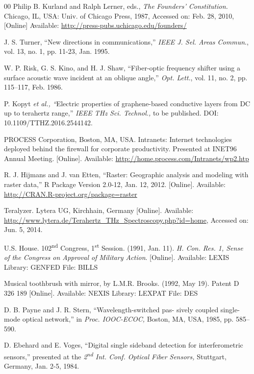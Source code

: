 \documentclass{ieeeaccess}
\begin{document}
\begin{thebibliography}{00}
 Philip B. Kurland and Ralph Lerner, eds., \emph{The
Founders' Constitution.} Chicago, IL, USA: Univ. of Chicago Press,
1987, Accessed on: Feb. 28, 2010, [Online] Available:
\underline{http://press-pubs.uchicago.edu/founders/}

 J. S. Turner, ``New directions in communications,'' \emph{IEEE J. Sel. Areas Commun}., vol. 13, no. 1, pp. 11-23, Jan. 1995.

 W. P. Risk, G. S. Kino, and H. J. Shaw, ``Fiber-optic frequency shifter using a surface acoustic wave incident at an oblique angle,'' \emph{Opt. Lett.}, vol. 11, no. 2, pp. 115--117, Feb. 1986.

 P. Kopyt \emph{et al., ``}Electric properties of graphene-based conductive layers from DC up to terahertz range,'' \emph{IEEE THz Sci. Technol.,} to be published. DOI: 10.1109/TTHZ.2016.2544142.

 PROCESS Corporation, Boston, MA, USA. Intranets:
Internet technologies deployed behind the firewall for corporate
productivity. Presented at INET96 Annual Meeting. [Online].
Available: \underline{http://home.process.com/Intranets/wp2.htp}

 R. J. Hijmans and J. van Etten, ``Raster: Geographic analysis and modeling with raster data,'' R Package Version 2.0-12, Jan. 12, 2012. [Online]. Available: \underline {http://CRAN.R-project.org/package=raster}

 Teralyzer. Lytera UG, Kirchhain, Germany [Online].
Available:
\underline{http://www.lytera.de/Terahertz\_THz\_Spectroscopy.}\break\underline{php?id=home}, Accessed on: Jun. 5, 2014.

 U.S. House. 102\textsuperscript{nd} Congress, 1\textsuperscript{st} Session. (1991, Jan. 11). \emph{H. Con. Res. 1, Sense of the Congress on Approval of}  \emph{Military Action}. [Online]. Available: LEXIS Library: GENFED File: BILLS

 Musical toothbrush with mirror, by L.M.R. Brooks. (1992, May 19). Patent D 326 189 [Online]. Available: NEXIS Library: LEXPAT File: DES

 D. B. Payne and J. R. Stern, ``Wavelength-switched pas- sively coupled single-mode optical network,'' in \emph{Proc. IOOC-ECOC,} Boston, MA, USA, 1985, pp. 585--590.

 D. Ebehard and E. Voges, ``Digital single sideband detection for interferometric sensors,'' presented at the \emph{2\textsuperscript{nd} Int. Conf. Optical Fiber Sensors,} Stuttgart, Germany, Jan. 2-5, 1984.


\end{thebibliography}
\end{document}
